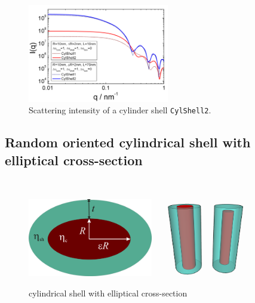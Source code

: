 \begin{figure}[htb]
\begin{center}
\includegraphics[width=0.55\textwidth,height=0.4\textwidth]{../images/form_factor/cylindrical_obj/CylShell2IQ.png}
\end{center}
\caption{Scattering intensity of a cylinder shell \texttt{CylShell2}.}
\label{fig:CylShell2}
\end{figure}



\clearpage
\subsection{Random oriented cylindrical shell with elliptical cross-section}
\label{sect:random_ellCylinderShell}
~\\

\begin{figure}[htb]
\begin{center}
\includegraphics[width=0.4866\textwidth,height=.304\textwidth]{../images/form_factor/cylindrical_obj/ellCylShell_shape.png}
\hspace{0.0\textwidth}
\includegraphics[width=0.4\textwidth,height=.293\textwidth]{../images/form_factor/cylindrical_obj/CylShell.png}
\end{center}
\caption{cylindrical shell with elliptical cross-section}
\label{fig:ellCylShell}
\end{figure}

